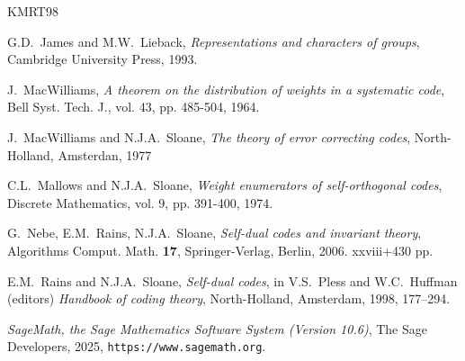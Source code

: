\documentclass[a4paper,reqno]{amsart}
\theoremstyle{definition}
\theoremstyle{remark} \newtheorem{remark}[theorem]{Remark}
\numberwithin{equation}{section}
\begin{document}
\begin{thebibliography}{KMRT98}


 G.D.~James and M.W.~Lieback, \emph{Representations and characters of groups}, Cambridge University Press, 1993.
 

 J.~MacWilliams, \emph{A theorem on the distribution of weights in a systematic code}, Bell Syst. Tech. J., vol. 43, pp. 485-504, 1964.

 J.~MacWilliams and N.J.A.~Sloane, \emph{The theory of error correcting codes}, North-Holland, Amsterdan, 1977

 C.L.~Mallows and N.J.A.~Sloane, \emph{Weight enumerators of self-orthogonal codes}, Discrete Mathematics, vol. 9, pp. 391-400, 1974.

 G.~Nebe, E.M.~Rains, N.J.A.~Sloane, \emph{Self-dual codes and invariant theory}, Algorithms Comput. Math. \textbf{17},
Springer-Verlag, Berlin, 2006. xxviii+430 pp.


 E.M.~Rains and N.J.A.~Sloane, \emph{Self-dual codes}, in V.S.~Pless and W.C.~Huffman (editors) \emph{Handbook of coding theory}, North-Holland, Amsterdam, 1998, 177--294.

\newcommand{\etalchar}[1]{$^{#1}$}
\bibitem[S{\etalchar{+}}09]{sage}
\emph{{S}ageMath, the {S}age {M}athematics {S}oftware {S}ystem ({V}ersion
  10.6)}, The Sage Developers, 2025, {\tt https://www.sagemath.org}.




\end{thebibliography}
\end{document}
